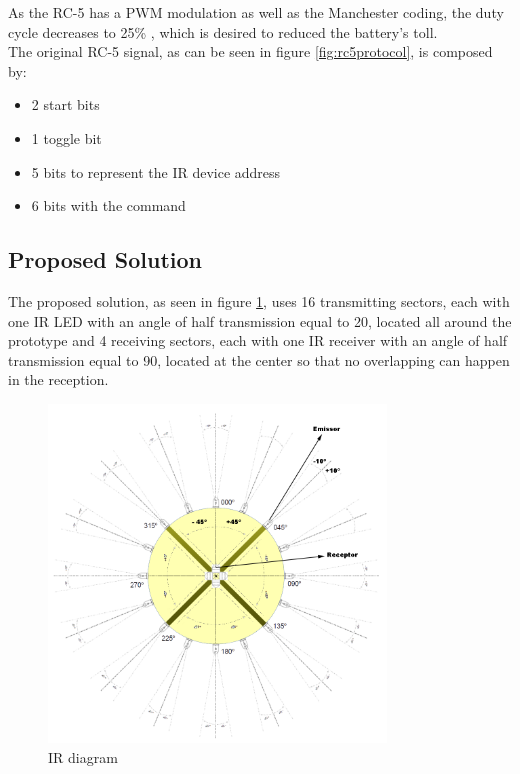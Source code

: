 As the RC-5 has a PWM modulation as well as the Manchester coding, the duty cycle decreases to 25\% , which is desired to reduced the battery's toll.\\

The original RC-5 signal, as can be seen in figure \ref{fig:rc5protocol}, is composed by:
\begin{itemize}
\item 2 start bits
\item 1 toggle bit
\item 5 bits to represent the IR device address
\item 6 bits with the command
\end{itemize} 


\subsection{Proposed Solution}
\label{subsection:solution}
The proposed solution, as seen in figure \ref{fig:irdiagram}, uses 16 transmitting sectors, each with one IR LED with an angle of half transmission equal to 20\degree , located all around the prototype and 4 receiving sectors, each with one IR receiver with an angle of half transmission equal to 90\degree , located at the center so that no overlapping can happen in the reception.\\
\begin{figure}[!htb]
  \centering
  \includegraphics[width=0.8\textwidth]{Figures/esquemaIR16.png}
  \caption[IR diagram]{IR diagram}
  \label{fig:irdiagram}
\end{figure}

